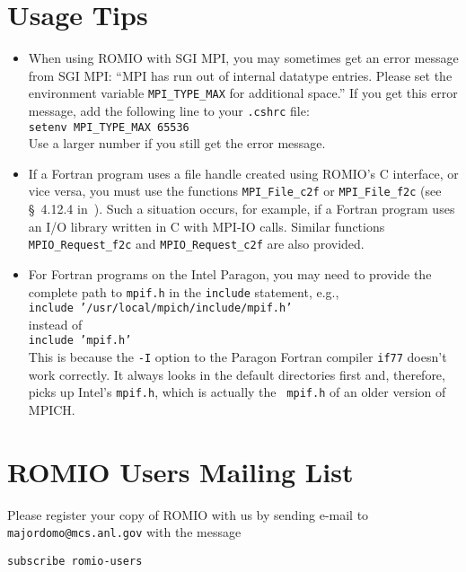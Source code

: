 %
%
\section{Usage Tips}
\begin{itemize}
\item When using ROMIO with SGI MPI, you may
sometimes get an error message from SGI MPI: ``MPI has run out of
internal datatype entries. Please set the environment variable
{\tt MPI\_TYPE\_MAX} for additional space.'' If you get this error message,
add the following line to your {\tt .cshrc} file:\\
\hspace*{.4in} {\tt setenv MPI\_TYPE\_MAX 65536}\\
Use a larger number if you still get the error message.
\item If a Fortran program uses a file handle created using ROMIO's C
interface, or vice versa, you must use the functions {\tt MPI\_File\_c2f} 
or {\tt MPI\_File\_f2c} (see \S~4.12.4 in~\cite{mpi97a}). Such a
situation occurs, for example, if a Fortran program uses an I/O
library written in C 
with MPI-IO calls. Similar functions {\tt MPIO\_Request\_f2c} and
{\tt MPIO\_Request\_c2f} are also provided.
\item For Fortran programs on the Intel Paragon, you may need
to provide the complete path to {\tt mpif.h} in the {\tt include}
statement, e.g., \\
\hspace*{.4in} {\tt include '/usr/local/mpich/include/mpif.h'}\\
instead of \\
\hspace*{.4in} {\tt include 'mpif.h'}\\ 
This is because the {\tt -I}
option to the Paragon Fortran compiler {\tt if77} doesn't work
correctly. It always looks in the default directories first and,
therefore, picks up Intel's {\tt mpif.h}, which is actually the {\tt
mpif.h} of an older version of MPICH.

\end{itemize}

%
%
\section{ROMIO Users Mailing List}
Please register your copy of ROMIO with us by sending e-mail
to {\tt majordomo@mcs.anl.gov} with the message

{\tt subscribe romio-users}

